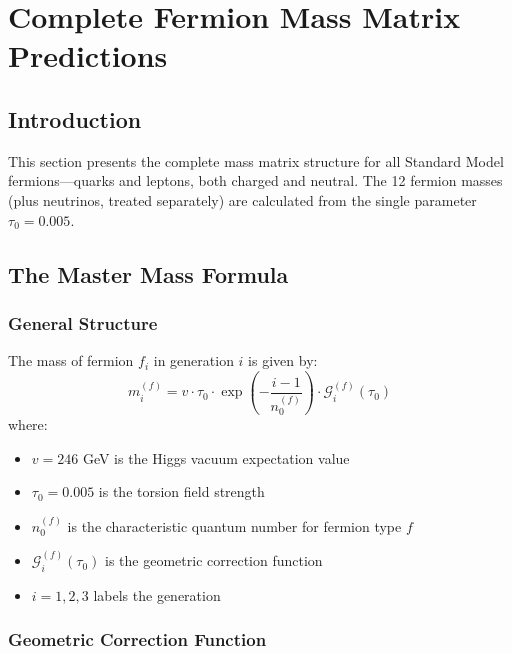 \section{Complete Fermion Mass Matrix Predictions}
\label{sec:fermion_masses_complete}

\subsection{Introduction}

This section presents the complete mass matrix structure for all Standard Model fermions—quarks and leptons, both charged and neutral. The 12 fermion masses (plus neutrinos, treated separately) are calculated from the single parameter $\tau_0 = 0.005$.

\subsection{The Master Mass Formula}

\subsubsection{General Structure}

\begin{theorem}
The mass of fermion $f_i$ in generation $i$ is given by:
\begin{equation}
    m_i^{(f)} = v \cdot \tau_0 \cdot \exp\left(-\frac{i-1}{n_0^{(f)}}\right) \cdot \mathcal{G}_i^{(f)}(\tau_0)
\end{equation}
where:
\begin{itemize}
    \item $v = 246$ GeV is the Higgs vacuum expectation value
    \item $\tau_0 = 0.005$ is the torsion field strength
    \item $n_0^{(f)}$ is the characteristic quantum number for fermion type $f$
    \item $\mathcal{G}_i^{(f)}(\tau_0)$ is the geometric correction function
    \item $i = 1, 2, 3$ labels the generation
\end{itemize}
\end{theorem}

\subsubsection{Geometric Correction Function}

